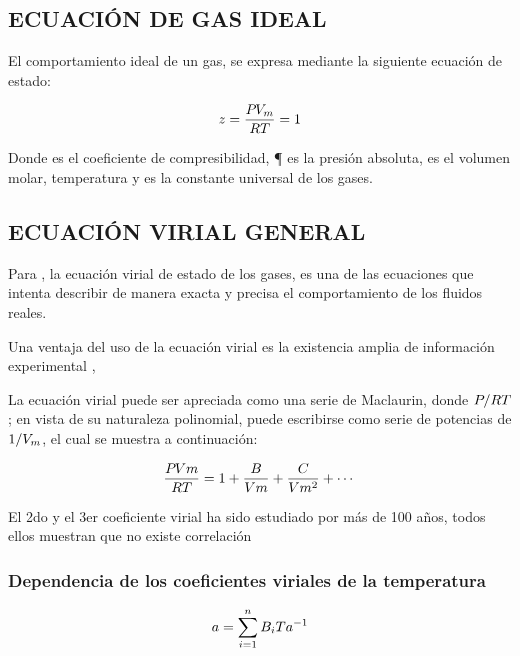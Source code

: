 \subsection{ECUACIÓN DE GAS IDEAL}
    El comportamiento ideal de un gas, se expresa mediante la siguiente ecuación de estado:

    \begin{align}
      z = \frac{P_{} V_m}{R T} = 1
    \end{align}

    Donde {\zFactor} es el coeficiente de compresibilidad, {\P{}} es la presión absoluta, {\Vm} es el volumen molar, {\T{}} temperatura y {\UnivConstantGas} es la constante universal de los gases.

\subsection{ECUACIÓN VIRIAL GENERAL}
    \label{cap2:subsec:tagEqnvirial}
    Para \parencite[p. 37]{Sengers1987equations}, la ecuación virial de estado de los gases, es una de las ecuaciones que intenta describir de manera exacta y precisa el comportamiento de los fluidos reales. 

    Una ventaja del uso de la ecuación virial es la existencia amplia de información experimental \Parencite[p. 38]{Sengers1987equations}, 

    La ecuación virial puede ser apreciada como una serie de Maclaurin, donde ${P_{}}/{{R}{} T}$; en vista de su naturaleza polinomial, puede escribirse como serie de potencias de $1/V_m$, el cual se muestra a continuación:

    \begin{equation}
      \eqVirialForVDevelop{}
    \end{equation}
    \eqVirialForVDevelopNaming
    
    El 2do y el 3er coeficiente virial ha sido estudiado por más de 100 años, todos ellos muestran que no existe correlación \parencite{thirdVirialTing}



  
\subsubsection*{Dependencia de los coeficientes viriales de la temperatura}
    \begin{equation}
      a = \sum_{i=1}^{n} B_{i} Ta^{-1}{}
    \end{equation}
    
